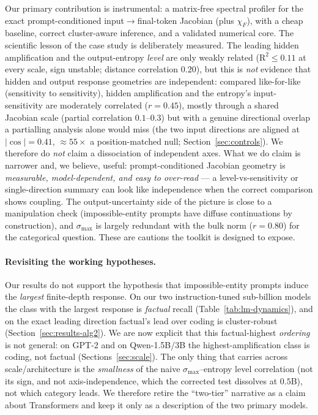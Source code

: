 \documentclass{article}
\begin{document}
Our primary contribution is instrumental: a matrix-free spectral profiler for the exact
prompt-conditioned input$\to$final-token Jacobian (plus $\chi_F$), with a cheap baseline, correct cluster-aware inference,
and a validated numerical core. The scientific lesson of the case study is deliberately measured. The
leading hidden amplification and the output-entropy \emph{level} are only weakly related
($\mathrm{R}^2\le0.11$ at every scale, sign unstable; distance correlation $0.20$), but this is \emph{not} evidence that hidden and output
response geometries are independent: compared like-for-like (sensitivity to sensitivity), hidden
amplification and the entropy's input-sensitivity are moderately correlated ($r=0.45$), mostly through
a shared Jacobian scale (partial correlation $0.1$--$0.3$) but with a genuine directional overlap a
partialling analysis alone would miss (the two input directions are aligned at
$|\!\cos|=0.41$, $\approx\!55\times$ a position-matched null; Section~\ref{sec:controls}). We therefore do \emph{not} claim
a dissociation of independent axes. What
we do claim is narrower and, we believe, useful: prompt-conditioned Jacobian geometry is
\emph{measurable, model-dependent, and easy to over-read} --- a level-vs-sensitivity or
single-direction summary can look like independence when the correct comparison shows coupling. The
output-uncertainty side of the picture is close to a manipulation check (impossible-entity prompts
have diffuse continuations by construction), and $\sigma_{\max}$ is largely redundant with the bulk
norm ($r=0.80$) for the categorical question. These are cautions the toolkit is designed to expose.

\paragraph{Revisiting the working hypotheses.}
Our results do not support the hypothesis that impossible-entity prompts induce the
\emph{largest} finite-depth response. On our two instruction-tuned sub-billion models the class with
the largest response is \emph{factual} recall (Table~\ref{tab:lm-dynamics}), and on the exact leading
direction factual's lead over coding is cluster-robust (Section~\ref{sec:results-alg2}). We are now
explicit that this factual-highest \emph{ordering} is not general: on GPT-2 and on Qwen-1.5B/3B the
highest-amplification class is coding, not factual (Sections~\ref{sec:scale}). The only thing that
carries across scale/architecture is the \emph{smallness} of the naive $\sigma_{\max}$--entropy level
correlation (not its sign, and not axis-independence, which the corrected test dissolves at $0.5$B),
not which category leads. We therefore retire the ``two-tier''
narrative as a claim about Transformers and keep it only as a description of the two primary models.
\end{document}
